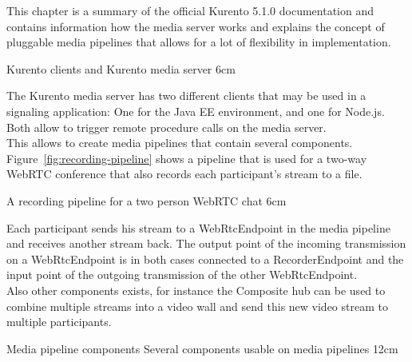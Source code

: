 \documentclass[../../../thesis.tex]{subfiles}
\begin{document}
This chapter is a summary of the official Kurento 5.1.0 documentation\cite{kurento-doc} and contains information how the media server works and explains the concept of pluggable media pipelines that allows for a lot of flexibility in implementation.

							{Kurento clients and Kurento media server\cite[chapter 3]{kurento-doc}}
							{6cm}

\noindent
The Kurento media server has two different clients that may be used in a signaling application: One for the Java EE environment, and one for Node.js. Both allow to trigger remote procedure calls on the media server.\\

\noindent
This allows to create media pipelines that contain several components. Figure~\ref{fig:recording-pipeline} shows a pipeline that is used for a two-way WebRTC conference that also records each participant's stream to a file.

							{A recording pipeline for a two person WebRTC chat\cite[chapter 9]{kurento-doc}}
							{6cm}

\noindent
Each participant sends his stream to a WebRtcEndpoint in the media pipeline and receives another stream back. The output point of the incoming transmission on a WebRtcEndpoint is in both cases connected to a RecorderEndpoint and the input point of the outgoing transmission of the other WebRtcEndpoint.\\

\noindent
Also other components exists, for instance the Composite hub can be used to combine multiple streams into a video wall and send this new video stream to multiple participants.

Media pipeline components
							{Several components usable on media pipelines\cite[chapter 3]{kurento-doc}}
							{12cm}
\end{document}
